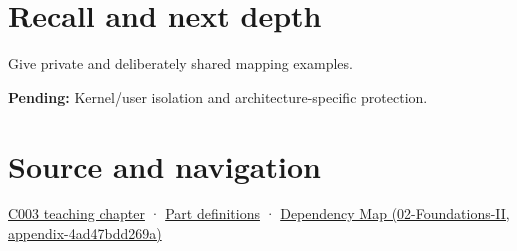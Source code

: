 \section{Recall and next depth}\label{appendix-c2a9ad1e2b49-recall-and-next-depth}

Give private and deliberately shared mapping examples.

\textbf{Pending:} Kernel/user isolation and architecture-specific protection.

\section{Source and navigation}\label{appendix-c2a9ad1e2b49-source-and-navigation}

\href{Continuous\%20Notes/Computing\%20Foundations\%20-\%20From\%20Bits\%20to\%20C++\%20and\%20Systems\%20APIs\#Where\%20the\%20bytes\%20live}{C003 teaching chapter} · \hyperref[appendix-fd090d982a15-m003---parts-41-60]{Part definitions} · \href{../02-Foundations-II/main.pdf\#nameddest=appendix-4ad47bdd269a}{Dependency Map (02-Foundations-II, appendix-4ad47bdd269a)}
